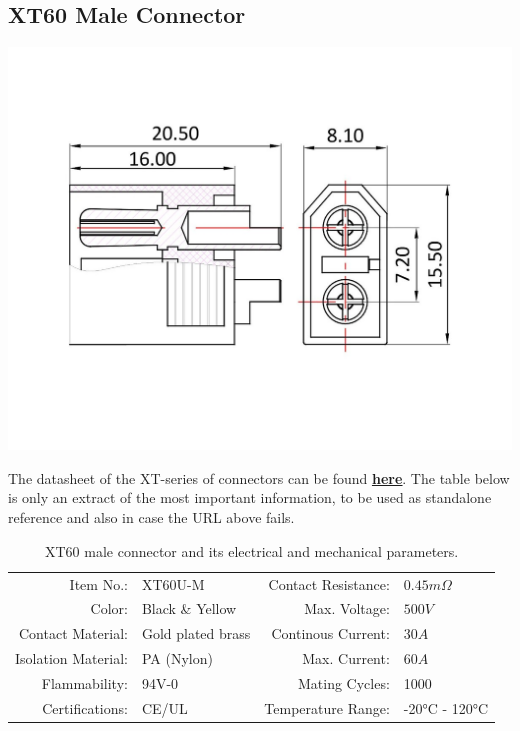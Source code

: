 \clearpage %

\subsection{XT60 Male Connector}

\includegraphics[width=\textwidth]{contents/figures/xt60_m.jpg}

The datasheet of the XT-series of connectors can be found \href{https://www.lcsc.com/datasheet/lcsc_datasheet_1810251312_Changzhou-Amass-Elec-XT60U-M_C129184.pdf}{\textbf{\underline{here}}}.
The table below is only an extract of the most important information, to be used as standalone reference and also in case the URL above fails.

\begin{table}[h] %
    \begin{tabular}{rlrl}
         Item No.:&  XT60U-M &  Contact Resistance:& $0.45m \Omega$\\
         Color:&  Black \& Yellow&  Max. Voltage:& $500V$\\
         Contact Material:&  Gold plated brass&  Continous Current:& $30A$\\
         Isolation Material:&  PA (Nylon)&  Max. Current:& $60A$\\
         Flammability:&  94V-0&  Mating Cycles:& 1000\\
         Certifications:&  CE/UL&  Temperature Range:& -20°C - 120°C\\
    \end{tabular}
    \caption{XT60 male connector and its electrical and mechanical parameters.}
    \label{xt60_m_specs}
\end{table}

